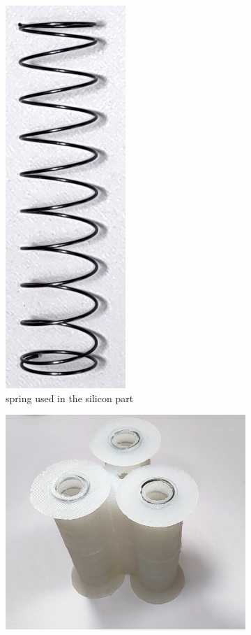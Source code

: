 \documentclass[twoside, 11pt]{article}
\begin{document}
\begin{figure}[H]
\begin{subfigure}[t]{0.17\linewidth}
		\includegraphics[width=0.5\textwidth]{spring}
		\caption{spring used in the silicon part}
	\end{subfigure}
	\begin{subfigure}[t]{0.33\linewidth}
		\centering
		\includegraphics[width=\textwidth]{silicon_with_spring}

\end{subfigure}
\end{figure}
\end{document}

